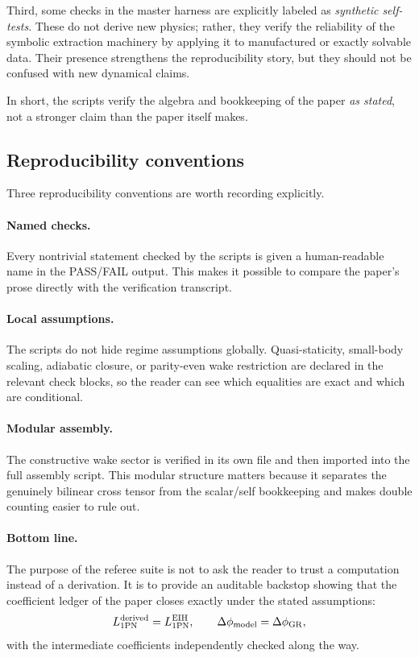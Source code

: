 \documentclass[11pt]{article}
\begin{document}
Third, some checks in the master harness are explicitly labeled as \emph{synthetic
self-tests}. These do not derive new physics; rather, they verify the reliability of the
symbolic extraction machinery by applying it to manufactured or exactly solvable data.
Their presence strengthens the reproducibility story, but they should not be confused with
new dynamical claims.

In short, the scripts verify the algebra and bookkeeping of the paper \emph{as stated},
not a stronger claim than the paper itself makes.

\subsection{Reproducibility conventions}
\label{sec:verification-conventions}

Three reproducibility conventions are worth recording explicitly.

\paragraph{Named checks.}
Every nontrivial statement checked by the scripts is given a human-readable name in the
PASS/FAIL output. This makes it possible to compare the paper's prose directly with the
verification transcript.

\paragraph{Local assumptions.}
The scripts do not hide regime assumptions globally. Quasi-staticity, small-body scaling,
adiabatic closure, or parity-even wake restriction are declared in the relevant check
blocks, so the reader can see which equalities are exact and which are conditional.

\paragraph{Modular assembly.}
The constructive wake sector is verified in its own file and then imported into the full
assembly script. This modular structure matters because it separates the genuinely bilinear
cross tensor from the scalar/self bookkeeping and makes double counting easier to rule out.

\paragraph{Bottom line.}
The purpose of the referee suite is not to ask the reader to trust a computation instead of
a derivation. It is to provide an auditable backstop showing that the coefficient ledger of
the paper closes exactly under the stated assumptions:
\begin{equation}
L_{\rm 1PN}^{\rm derived}=L_{\rm 1PN}^{\rm EIH},
\qquad
\Delta\phi_{\rm model}=\Delta\phi_{\rm GR},
\label{eq:verification-bottom-line}
\end{equation}
with the intermediate coefficients independently checked along the way.
\end{document}
